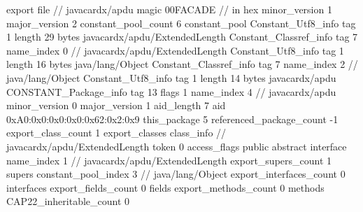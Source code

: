export file {		// javacardx/apdu
	magic	00FACADE		 // in hex
	minor_version	1
	major_version	2
	constant_pool_count	6
	constant_pool {
		Constant_Utf8_info {
			tag	1
			length	29
			bytes	javacardx/apdu/ExtendedLength
		}
		Constant_Classref_info {
			tag	7
			name_index	0		// javacardx/apdu/ExtendedLength
		}
		Constant_Utf8_info {
			tag	1
			length	16
			bytes	java/lang/Object
		}
		Constant_Classref_info {
			tag	7
			name_index	2		// java/lang/Object
		}
		Constant_Utf8_info {
			tag	1
			length	14
			bytes	javacardx/apdu
		}
		CONSTANT_Package_info {
			tag	13
			flags	1
			name_index	4		// javacardx/apdu
			minor_version	0
			major_version	1
			aid_length	7
			aid	0xA0:0x0:0x0:0x0:0x62:0x2:0x9
		}
	}
	this_package	5
	referenced_package_count	-1
	export_class_count	1
	export_classes {
		class_info {		// javacardx/apdu/ExtendedLength
			token	0
			access_flags	public abstract interface
			name_index	1		// javacardx/apdu/ExtendedLength
			export_supers_count	1
			supers {
				constant_pool_index	3		// java/lang/Object
			}
			export_interfaces_count	0
			interfaces {
			}
			export_fields_count	0
			fields {
			}
			export_methods_count	0
			methods {
			}
			CAP22_inheritable_count	0
		}
	}
}
